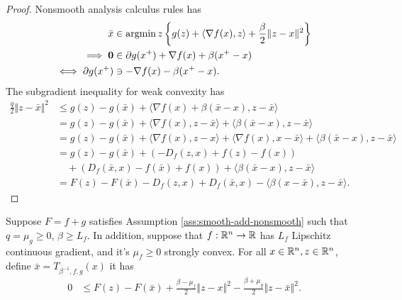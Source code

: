 \documentclass[12pt]{report}
\begin{document}
    \begin{proof}
        Nonsmooth analysis calculus rules has 
        \begin{align*}
            \bar x &\in \mathop{\rm argmin}\limits{z} \left\lbrace
                g(z) + \langle \nabla f(x), z\rangle + \frac{\beta}{2}\Vert z - x\Vert^2
            \right\rbrace
            \\
            \implies
            \mathbf 0 
            &\in \partial g(x^+) + \nabla f(x) + \beta(x^+ - x)
            \\
            \iff 
            \partial g(x^+) &\ni
            - \nabla f(x) - \beta(x^+ - x). 
        \end{align*}
        The subgradient inequality for weak convexity has 
        \begin{align*}
            \frac{q}{2}\Vert z - \bar x\Vert^2 
            &\le 
            g(z) - g(\bar x) + \langle \nabla f(x) + \beta(\bar x - x), z - \bar x\rangle
            \\
            &= 
            g(z) - g(\bar x) + \langle \nabla f(x), z - \bar x\rangle + \langle \beta(\bar x - x), z - \bar x\rangle
            \\
            &= g(z) - g(\bar x) + \langle \nabla f(x), z - x\rangle
            + \langle \nabla f(x), x - \bar x\rangle
            + \langle \beta(\bar x - x), z - \bar x\rangle
            \\
            &= 
            g(z) - g(\bar x) 
            + (-D_f(z, x) + f(z) - f(x))
            \\
            & \quad 
            + (D_f(\bar x, x) - f(\bar x) + f(x))
            + \langle \beta(\bar x - x), z - \bar x\rangle
            \\
            &= F(z) - F(\bar x) - D_f(z, x) + D_f(\bar x, x) 
            - \langle \beta(x - \bar x), z - \bar x\rangle. 
        \end{align*}
    \end{proof}
    \begin{theorem}\label{thm:cnvx-pg-ineq}
        Suppose $F = f + g$ satisfies Assumption \ref{ass:smooth-add-nonsmooth} such that $q = \mu_g \ge 0$, $\beta \ge L_f$. 
        In addition, suppose that $f:\mathbb R^n\rightarrow \mathbb R$ has $L_f$ Lipschitz continuous gradient, and it's $\mu_f \ge 0$ strongly convex. 
        For all $x \in \mathbb R^n, z \in \mathbb R^n$, define $\bar x = T_{\beta^{-1}, f, g}(x)$ it has 
        \begin{align*}
            0 &\le 
            F(z) - F(\bar x) + 
            \frac{\beta - \mu_f}{2}\Vert z - x\Vert^2
            - \frac{\beta + \mu_g}{2}\Vert z - \bar x\Vert^2. 
        \end{align*}
    \end{theorem}
\end{document}
